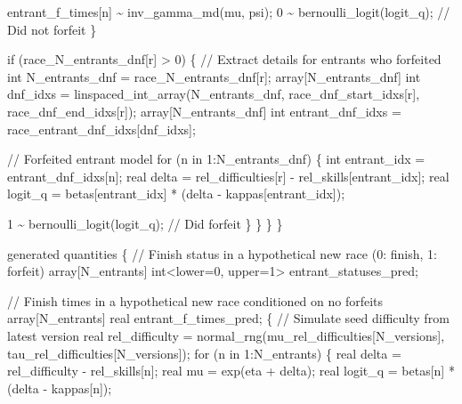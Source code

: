 \documentclass[
  letterpaper,
  DIV=11,
  numbers=noendperiod]{scrartcl}
\newenvironment{Shaded}{\begin{snugshade}}{\end{snugshade}}
\newcommand{\CommentTok}[1]{\textcolor[rgb]{0.37,0.37,0.37}{#1}}
\newcommand{\ControlFlowTok}[1]{\textcolor[rgb]{0.00,0.23,0.31}{#1}}
\newcommand{\DataTypeTok}[1]{\textcolor[rgb]{0.68,0.00,0.00}{#1}}
\newcommand{\DecValTok}[1]{\textcolor[rgb]{0.68,0.00,0.00}{#1}}
\newcommand{\KeywordTok}[1]{\textcolor[rgb]{0.00,0.23,0.31}{#1}}
\newcommand{\NormalTok}[1]{\textcolor[rgb]{0.00,0.23,0.31}{#1}}
\begin{document}
\begin{codelisting}
\begin{Shaded}
\begin{Highlighting}[]
\NormalTok{      entrant\_f\_times[n] \textasciitilde{} inv\_gamma\_md(mu, psi);}
      \DecValTok{0}\NormalTok{ \textasciitilde{} bernoulli\_logit(logit\_q); }\CommentTok{// Did not forfeit}
\NormalTok{    \}}

    \ControlFlowTok{if}\NormalTok{ (race\_N\_entrants\_dnf[r] \textgreater{} }\DecValTok{0}\NormalTok{) \{}
      \CommentTok{// Extract details for entrants who forfeited}
      \DataTypeTok{int}\NormalTok{ N\_entrants\_dnf = race\_N\_entrants\_dnf[r];}
      \DataTypeTok{array}\NormalTok{[N\_entrants\_dnf]}
        \DataTypeTok{int}\NormalTok{ dnf\_idxs = linspaced\_int\_array(N\_entrants\_dnf,}
\NormalTok{                                           race\_dnf\_start\_idxs[r],}
\NormalTok{                                           race\_dnf\_end\_idxs[r]);}
      \DataTypeTok{array}\NormalTok{[N\_entrants\_dnf]}
        \DataTypeTok{int}\NormalTok{ entrant\_dnf\_idxs = race\_entrant\_dnf\_idxs[dnf\_idxs];}

      \CommentTok{// Forfeited entrant model}
      \ControlFlowTok{for}\NormalTok{ (n }\ControlFlowTok{in} \DecValTok{1}\NormalTok{:N\_entrants\_dnf) \{}
        \DataTypeTok{int}\NormalTok{ entrant\_idx = entrant\_dnf\_idxs[n];}
        \DataTypeTok{real}\NormalTok{ delta = rel\_difficulties[r] {-} rel\_skills[entrant\_idx];}
        \DataTypeTok{real}\NormalTok{ logit\_q = betas[entrant\_idx] * (delta {-} kappas[entrant\_idx]);}

        \DecValTok{1}\NormalTok{ \textasciitilde{} bernoulli\_logit(logit\_q); }\CommentTok{// Did forfeit}
\NormalTok{      \}}
\NormalTok{    \}}
\NormalTok{  \}}
\NormalTok{\}}

\KeywordTok{generated quantities}\NormalTok{ \{}
  \CommentTok{// Finish status in a hypothetical new race (0: finish, 1: forfeit)}
  \DataTypeTok{array}\NormalTok{[N\_entrants] }\DataTypeTok{int}\NormalTok{\textless{}}\KeywordTok{lower}\NormalTok{=}\DecValTok{0}\NormalTok{, }\KeywordTok{upper}\NormalTok{=}\DecValTok{1}\NormalTok{\textgreater{} entrant\_statuses\_pred;}

  \CommentTok{// Finish times in a hypothetical new race conditioned on no forfeits}
  \DataTypeTok{array}\NormalTok{[N\_entrants] }\DataTypeTok{real}\NormalTok{ entrant\_f\_times\_pred;}
\NormalTok{  \{}
    \CommentTok{// Simulate seed difficulty from latest version}
    \DataTypeTok{real}\NormalTok{ rel\_difficulty}
\NormalTok{      = normal\_rng(mu\_rel\_difficulties[N\_versions],}
\NormalTok{                   tau\_rel\_difficulties[N\_versions]);}
    \ControlFlowTok{for}\NormalTok{ (n }\ControlFlowTok{in} \DecValTok{1}\NormalTok{:N\_entrants) \{}
      \DataTypeTok{real}\NormalTok{ delta = rel\_difficulty {-} rel\_skills[n];}
      \DataTypeTok{real}\NormalTok{ mu = exp(eta + delta);}
      \DataTypeTok{real}\NormalTok{ logit\_q = betas[n] * (delta {-} kappas[n]);}


\end{Highlighting}
\end{Shaded}
\end{codelisting}
\end{document}
